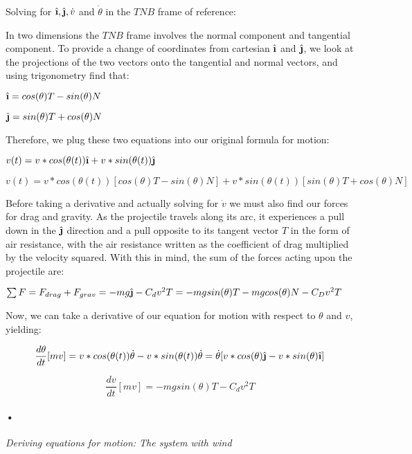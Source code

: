 \documentclass[12pt]{article}
\newcommand{\ihat}{\hat{\textbf{\i}}}
\newcommand{\jhat}{\hat{\textbf{\j}}}
\begin{document}
\begin{enumerate}
Solving for $\ihat, \jhat, \dot{v}$ and $\dot{\theta}$ in the $TNB$ frame of reference:

In two dimensions the $TNB$ frame involves the normal component and tangential component.  To provide a change of coordinates from cartesian $\ihat$ and $\jhat$, we look at the projections of the two vectors onto the tangential and normal vectors, and using trigonometry find that: 

\centerline{$ \ihat = cos(\theta)T - sin(\theta)N$}

\centerline{$\jhat = sin(\theta)T + cos(\theta)N$}

Therefore, we plug these two equations into our original formula for motion:\newline

\centerline{$v(t) = v*cos(\theta(t)) \ihat +  v*sin(\theta(t)) \jhat$}

\centerline{$v(t) = v*cos(\theta(t)) [cos(\theta)T - sin(\theta)N] +  v*sin(\theta(t)) [sin(\theta)T + cos(\theta)N]$}



Before taking a derivative and actually solving for $\dot{v}$ we must also find our forces for drag and gravity.  As the projectile travels along its arc, it experiences a pull down in the $\jhat$ direction and a pull opposite to its tangent vector $T$ in the form of air resistance, with the air resistance written as the coefficient of drag multiplied by the velocity squared.  With this in mind, the sum of the forces acting upon the projectile are:
\newline\newline
\centerline{$\sum F = F_{drag}+F_{grav} = -mg\jhat - C_d v^2 T = -mgsin(\theta)T-mgcos(\theta)N - C_D v^2T$}

Now, we can take a derivative of our equation for motion with respect to $\theta$ and $v$, yielding:\newline

\[ \frac{d\theta}{dt} [mv] = v*cos(\theta(t))\dot{\theta} - 
v*sin(\theta(t))\dot{\theta} = \dot{\theta}[v*cos(\theta)\jhat - v*sin(\theta)\ihat] \]

\[ \frac{dv}{dt} [mv]= -mgsin(\theta)T -C_dv^2T \]

\paragraph{•}
\large{\item\textit{Deriving equations for motion: The system with wind}}


\end{enumerate}
\end{document}
